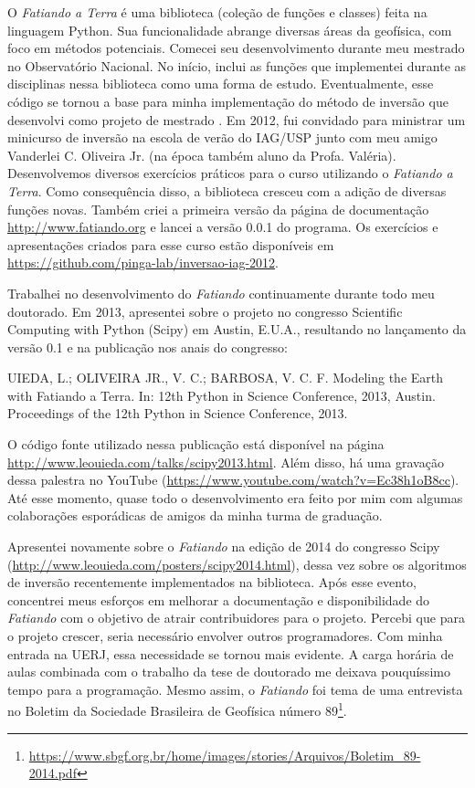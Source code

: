 \documentclass[12pt,a4paper,oneside,titlepage,onecolumn]{article}
\begin{document}
O \textit{Fatiando a Terra} é uma biblioteca (coleção de funções e classes)
feita na linguagem Python.
Sua funcionalidade abrange diversas áreas da geofísica, com foco em métodos
potenciais.
Comecei seu desenvolvimento durante meu mestrado no Observatório Nacional.
No início, inclui as funções que implementei durante as disciplinas nessa
biblioteca como uma forma de estudo.
Eventualmente, esse código se tornou a base para minha implementação do método
de inversão que desenvolvi como projeto de mestrado \citep[][cujo código está
disponível em
\url{https://github.com/pinga-lab/paper-planting-densities}]{seed}.
Em 2012, fui convidado para ministrar um minicurso de inversão na escola de
verão do IAG/USP junto com meu
amigo Vanderlei C. Oliveira Jr. (na época também aluno da Profa.  Valéria).
Desenvolvemos diversos exercícios práticos para o curso utilizando o
\textit{Fatiando a Terra}.
Como consequência disso, a biblioteca cresceu com a adição de diversas funções
novas.
Também criei a primeira versão da página de documentação
\url{http://www.fatiando.org} e lancei a versão 0.0.1 do programa.
Os exercícios e apresentações criados para esse curso estão disponíveis em
\url{https://github.com/pinga-lab/inversao-iag-2012}.

Trabalhei no desenvolvimento do \textit{Fatiando} continuamente durante todo
meu doutorado.
Em 2013, apresentei sobre o projeto no congresso Scientific Computing with
Python (Scipy) em Austin, E.U.A., resultando no lançamento da versão 0.1 e na
publicação nos anais do congresso:

\begin{displayquote}
    UIEDA, L.; OLIVEIRA JR., V. C.; BARBOSA, V. C. F.  Modeling the Earth with
    Fatiando a Terra. In: 12th Python in Science Conference, 2013, Austin.
    Proceedings of the 12th Python in Science Conference, 2013.
\end{displayquote}

O código fonte utilizado nessa publicação está disponível na página
\url{http://www.leouieda.com/talks/scipy2013.html}. Além disso, há uma gravação
dessa palestra no YouTube (\url{https://www.youtube.com/watch?v=Ec38h1oB8cc}).
Até esse momento, quase todo o desenvolvimento era feito por mim com algumas
colaborações esporádicas de amigos da minha turma de graduação.

Apresentei novamente sobre o \textit{Fatiando} na edição de 2014 do congresso
Scipy (\url{http://www.leouieda.com/posters/scipy2014.html}), dessa vez sobre
os algoritmos de inversão recentemente implementados na biblioteca.
Após esse evento, concentrei meus esforços em melhorar a documentação e
disponibilidade do \textit{Fatiando} com o objetivo de atrair
contribuidores para o projeto.
Percebi que para o projeto crescer, seria necessário envolver outros
programadores.
Com minha entrada na UERJ, essa necessidade se tornou mais evidente.
A carga horária de aulas combinada com o trabalho da tese de doutorado me
deixava pouquíssimo tempo para a programação.
Mesmo assim, o \textit{Fatiando} foi tema de uma entrevista no Boletim da
Sociedade Brasileira de Geofísica número
89\footnote{\url{https://www.sbgf.org.br/home/images/stories/Arquivos/Boletim_89-2014.pdf}}.
\end{document}

